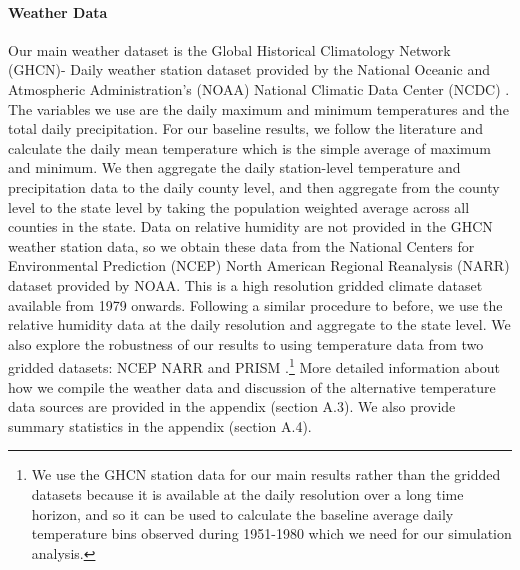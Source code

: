 \documentclass[11pt]{article}
\begin{document}
\paragraph*{Weather Data} Our main weather dataset is the Global Historical Climatology Network (GHCN)- Daily weather station dataset provided by the National Oceanic and Atmospheric Administration’s (NOAA) National Climatic Data Center (NCDC) \citep{Menne2012}. The variables we use are the daily maximum and minimum temperatures and the total daily precipitation. For our baseline results, we follow the literature \citep{Green2011} and calculate the daily mean temperature which is the simple average of maximum and minimum. We then aggregate the daily station-level temperature and precipitation data to the daily county level, and then aggregate from the county level to the state level by taking the population weighted average across all counties in the state. Data on relative humidity are not provided in the GHCN weather station data, so we obtain these data from the National Centers for Environmental Prediction (NCEP) North American Regional Reanalysis (NARR) dataset \citep{NARRa} provided by NOAA. This is a high resolution gridded climate dataset available from 1979 onwards. Following a similar procedure to before, we use the relative humidity data at the daily resolution and aggregate to the state level. We also explore the robustness of our results to using temperature data from two gridded datasets: NCEP NARR and PRISM \citep{PRISMa}.\footnote{We use the GHCN station data for our main results rather than the gridded datasets because it is available at the daily resolution over a long time horizon, and so it can be used to calculate the baseline average daily temperature bins observed during 1951-1980 which we need for our simulation analysis.} More detailed information about how we compile the weather data and discussion of the alternative temperature data sources are provided in the appendix (section A.3). We also provide summary statistics in the appendix (section A.4).%
\end{document}
